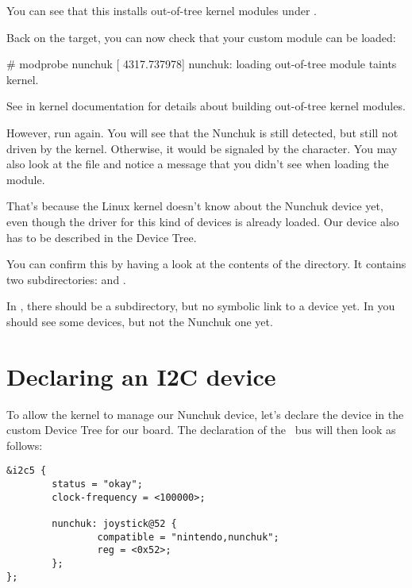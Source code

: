 {You can see that this installs out-of-tree kernel modules under
.

Back on the target, you can now check that your custom module can
be loaded:

\begin{bashinput}
# modprobe nunchuk
[ 4317.737978] nunchuk: loading out-of-tree module taints kernel.
\end{bashinput}

See  in kernel documentation
for details about building out-of-tree kernel modules.

However, run  again. You will see that the
Nunchuk is still detected, but still not driven by the kernel.
Otherwise, it would be signaled by the  character. You
may also look at the  file and notice a
 message that you didn't
see when loading the module.

That's because the Linux kernel doesn't know about the Nunchuk
device yet, even though the driver for this kind of devices is
already loaded. Our device also has to be described in the Device Tree.

You can confirm this by having a look at the contents of the
 directory.  It contains two subdirectories:
 and .

In , there should be a  subdirectory,
but no symbolic link to a device yet. In  you should
see some devices, but not the Nunchuk one yet.

\section{Declaring an I2C device}

To allow the kernel to manage our Nunchuk device, let's declare the
device in the custom Device Tree for our board. The declaration of the \busname\ 
bus will then look as follows:

\begin{verbatim}
&i2c5 {
        status = "okay";
        clock-frequency = <100000>;

        nunchuk: joystick@52 {
                compatible = "nintendo,nunchuk";
                reg = <0x52>;
        };
};
\end{verbatim}

}
